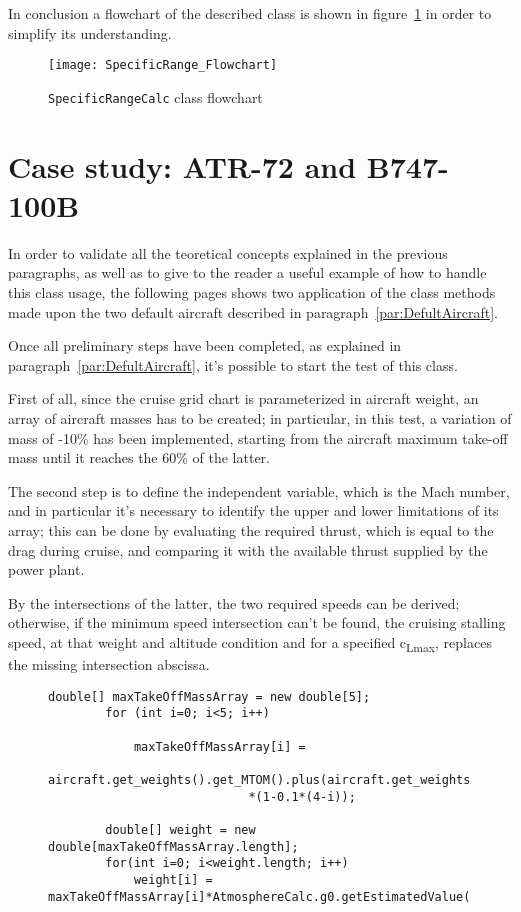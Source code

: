 \bigskip
\noindent
In conclusion a flowchart of the described class is shown in figure~\ref{fig:Figure7} in order to simplify its understanding.

\begin{figure}[t]
\centering
\texttt{[image: SpecificRange\_Flowchart]}
\caption{\lstinline[language=Java]!SpecificRangeCalc! class flowchart}
\label{fig:Figure7}
\end{figure}

\section{Case study: ATR-72 and B747-100B}

In order to validate all the teoretical concepts explained in the previous paragraphs, as well as to give to the reader a useful example of how to handle this class usage, the following pages shows two application of the class methods made upon the two default aircraft described in paragraph~\ref{par:DefultAircraft}.

\bigskip
\noindent
Once all preliminary steps have been completed, as explained in paragraph~\ref{par:DefultAircraft}, it's possible to start the test of this class. 

First of all, since the cruise grid chart is parameterized in aircraft weight, an array of aircraft masses has to be created; in particular, in this test, a variation of mass of -10\% has been implemented, starting from the aircraft maximum take-off mass until it reaches the 60\% of the latter. 

The second step is to define the independent variable, which is the Mach number, and in particular it's necessary to identify the upper and lower limitations of its array; this can be done by evaluating the required thrust, which is equal to the drag during cruise, and comparing it with the available thrust supplied by the power plant.

\noindent
By the intersections of the latter, the two required speeds can be derived; otherwise, if the minimum speed intersection can't be found, the cruising stalling speed, at that weight and altitude condition and for a specified c\textsubscript{Lmax}, replaces the missing intersection abscissa.

\begin{figure}[t]
\begin{lstlisting}[caption={Mass variation in Specific Range test - B747-100B}, captionpos=b, tabsize=2]
		double[] maxTakeOffMassArray = new double[5];
		for (int i=0; i<5; i++)
		
			maxTakeOffMassArray[i] =
							aircraft.get_weights().get_MTOM().plus(aircraft.get_weights().get_MLM()).divide(2).getEstimatedValue()
							*(1-0.1*(4-i));

		double[] weight = new double[maxTakeOffMassArray.length];
		for(int i=0; i<weight.length; i++)
			weight[i] = maxTakeOffMassArray[i]*AtmosphereCalc.g0.getEstimatedValue();
\end{lstlisting}
\end{figure}

